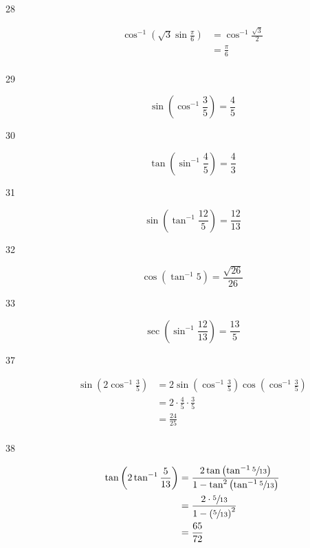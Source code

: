 \documentclass{exam}
\begin{document}
\begin{description}
      \item[28] 
        \begin{align*}
          \cos^{-1} \left( \sqrt{3} \sin \frac{\pi}{6} \right) & = \cos^{-1} \frac{\sqrt{3}}{2} \\
                                                               & = \boxed{ \frac{\pi}{6} } \\
        \end{align*}

      \item[29]
        \[
          \sin \left( \cos^{-1} \frac{3}{5} \right) = \frac{4}{5} 
        \]

      \item[30]
        \[
          \tan \left( \sin^{-1} \frac{4}{5} \right) = \frac{4}{3} 
        \]

      \item[31]
        \[
          \sin \left( \tan^{-1} \frac{12}{5} \right) = \frac{12}{13} 
        \]

      \item[32]
        \[
          \cos \left( \tan^{-1} 5 \right) = \frac{\sqrt{26}}{26} 
        \]

      \item[33]
        \[
          \sec \left( \sin^{-1} \frac{12}{13} \right) = \frac{13}{5} 
        \]

      \item[37]
        \begin{align*}
          \sin \left( 2 \cos^{-1} \frac{3}{5} \right) & = 2 \sin \left( \cos^{-1} \frac{3}{5} \right) \cos \left( \cos^{-1} \frac{3}{5} \right) \\
                                                      & = 2 \cdot \frac{4}{5} \cdot \frac{3}{5} \\
                                                      & = \frac{24}{25} \\
        \end{align*}

      \item[38]
        \begin{align*}
          \tan \left( 2 \tan^{-1} \frac{5}{13} \right) & = \frac{ 2 \tan \left( \tan^{-1} \sfrac{5}{13} \right) }
                                                                { 1 - \tan^2 \left( \tan^{-1} \sfrac{5}{13} \right) } \\
                                                       & = \frac{ 2 \cdot \sfrac{5}{13} }{1 - \left( \sfrac{5}{13} \right)^2 } \\
                                                       & = \frac{65}{72} \\
        \end{align*}

    \end{description}
\end{document}
